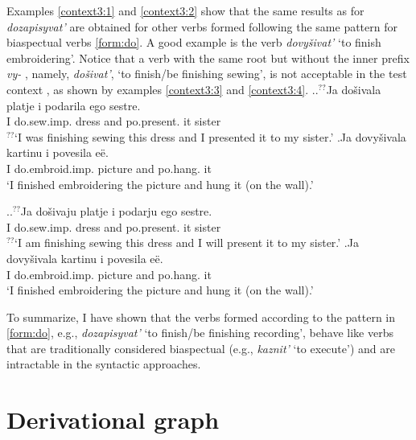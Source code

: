 Examples \ref{context3:1} and \ref{context3:2} show that the same results as for \textit{dozapisyvat'} are obtained for other verbs formed following the same pattern for biaspectual verbs  \ref{form:do}. A good example is the verb \textit{dovy\v{s}ivat'} `to finish embroidering'. Notice that a verb with the same root but without the inner prefix \textit{vy-}  , namely, \textit{do\v{s}ivat'}, `to finish/be finishing sewing', is not acceptable in the test context  , as shown by examples \ref{context3:3} and \ref{context3:4}.
\ex.\label{context3}\ag.\label{context3:3}$^{??}$Ja do\v{s}ivala platje i podarila\textsuperscript{\PF} ego sestre.\\
{}I do.sew.imp. dress and po.present. it sister\\
$^{??}$`I was finishing sewing this dress and I presented it to my sister.'
\bg.\label{context3:1}Ja dovy\v{s}ivala kartinu i povesila\textsuperscript{\PF} e\"e.\\
I do.embroid.imp. picture and po.hang. it\\
\trans `I finished embroidering the picture and hung it (on the wall).'

\ex.\label{context31}\ag.\label{context3:4}$^{??}$Ja do\v{s}ivaju platje i podarju\textsuperscript{\PF} ego sestre.\\
{}I do.sew.imp. dress and po.present. it sister\\
$^{??}$`I am finishing sewing this dress and I will present it to my sister.'
\bg.\label{context3:2}Ja dovy\v{s}ivala kartinu i povesila\textsuperscript{\PF} e\"e.\\
I do.embroid.imp. picture and po.hang. it\\
\trans `I finished embroidering the picture and hung it (on the wall).'

To summarize, I have shown that the verbs formed according to the pattern in \ref{form:do}, e.g., \textit{dozapisyvat'} `to finish/be finishing recording', behave like verbs that are traditionally considered biaspectual (e.g., \textit{kaznit'} `to execute') and are intractable in the syntactic approaches.


\section{Derivational graph}\label{section:graph}
